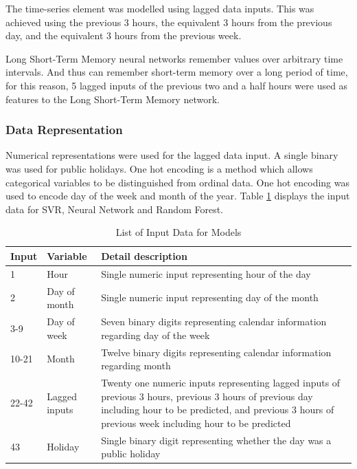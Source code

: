 The time-series element was modelled using lagged data inputs. This was achieved using the previous 3 hours, the equivalent 3 hours from the previous day, and the equivalent 3 hours from the previous week.

Long Short-Term Memory neural networks remember values over arbitrary time intervals. And thus can remember short-term memory over a long period of time, for this reason, 5 lagged inputs of the previous two and a half hours were used as features to the Long Short-Term Memory network.

\subsubsection{Data Representation}

Numerical representations were used for the lagged data input. A single binary was used for public holidays. One hot encoding is a method which allows categorical variables to be distinguished from ordinal data. One hot encoding was used to encode day of the week and month of the year. Table \ref{appendix:feature} displays the input data for SVR, Neural Network and Random Forest. 



\begin{table}
	\caption{List of Input Data for Models}
	\label{appendix:feature}
	\begin{tabular}{p{1cm}p{1.8cm}p{4.8cm}}
		\toprule
		Input & Variable      & Detail description \\
		\midrule
		1     & Hour          & Single numeric input representing hour of the day                                                                                              \\
		2     & Day of month  & Single numeric input representing day of the month                                                                                             \\
		3-9   & Day of week   & Seven binary digits representing calendar information regarding day of the week                                                                                            \\
		10-21 & Month         & Twelve binary digits representing calendar information regarding month                                                                                         \\
		22-42 & Lagged inputs & Twenty one numeric inputs representing lagged inputs of previous 3 hours, previous 3 hours of previous day including hour to be predicted, and previous 3 hours of previous week including hour to be predicted \\
		43    & Holiday       & Single binary digit representing whether the day was a public holiday  \\     \bottomrule                                                           
	\end{tabular}
\end{table}

